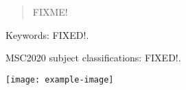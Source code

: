 \documentclass{article}
\begin{document}
\begin{abstract}
FIXME!
\end{abstract}

Keywords: FIXED!.

MSC2020 subject classifications: FIXED!.

\begin{center}
\texttt{[image: example-image]}
\end{center}
\end{document}
